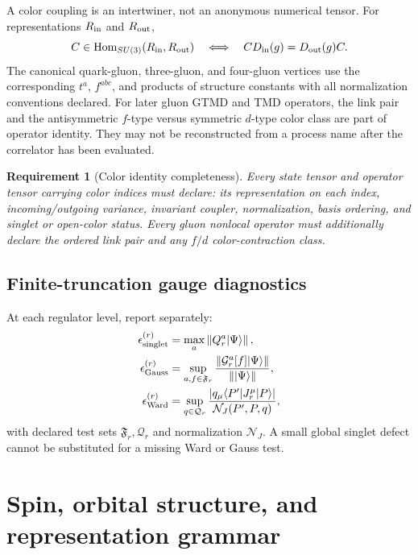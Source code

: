 \documentclass[11pt]{article}
\newtheorem{requirement}[definition]{Requirement}
\newcommand{\Hom}{\operatorname{Hom}}
\newcommand{\cG}{\mathcal G}
\newcommand{\cQ}{\mathcal Q}
\newcommand{\cN}{\mathcal N}
\newcommand{\abs}[1]{\left|#1\right|}
\newcommand{\norm}[1]{\left\lVert#1\right\rVert}
\begin{document}
A color coupling is an intertwiner, not an anonymous numerical tensor.  For
representations \(R_{\rm in}\) and \(R_{\rm out}\),
\begin{equation}
 C\in\Hom_{SU(3)}(R_{\rm in},R_{\rm out})
 \quad\Longleftrightarrow\quad
 C D_{\rm in}(g)=D_{\rm out}(g)C.
\label{eq:color-intertwiner}
\end{equation}
The canonical quark-gluon, three-gluon, and four-gluon vertices use the
corresponding \(t^a\), \(f^{abc}\), and products of structure constants with
all normalization conventions declared.  For later gluon GTMD and TMD
operators, the link pair and the antisymmetric \(f\)-type versus symmetric
\(d\)-type color class are part of operator identity.  They may not be
reconstructed from a process name after the correlator has been evaluated.

\begin{requirement}[Color identity completeness]
\label{req:color-identity}
Every state tensor and operator tensor carrying color indices must declare:
its representation on each index, incoming/outgoing variance, invariant
coupler, normalization, basis ordering, and singlet or open-color status.
Every gluon nonlocal operator must additionally declare the ordered link pair
and any \(f/d\) color-contraction class.
\end{requirement}

\subsection{Finite-truncation gauge diagnostics}

At each regulator level, report separately:
\begin{align}
 \epsilon_{\rm singlet}^{(r)}
 &=\max_a\norm{Q_r^a|\Psi\rangle},
\label{eq:singlet-defect}\\
 \epsilon_{\rm Gauss}^{(r)}
 &=\sup_{a,f\in\mathfrak F_r}
 \frac{\norm{\cG_r^a[f]|\Psi\rangle}}
 {\norm{|\Psi\rangle}},
\label{eq:gauss-defect}\\
 \epsilon_{\rm Ward}^{(r)}
 &=\sup_{q\in\cQ_r}
 \frac{\abs{q_\mu\langle P'|J_r^\mu|P\rangle}}
 {\cN_J(P',P,q)},
\label{eq:ward-defect-preview}
\end{align}
with declared test sets \(\mathfrak F_r,\cQ_r\) and normalization
\(\cN_J\).  A small global singlet defect cannot be substituted for a
missing Ward or Gauss test.

\section{Spin, orbital structure, and representation grammar}
\label{sec:symmetry}
\end{document}
